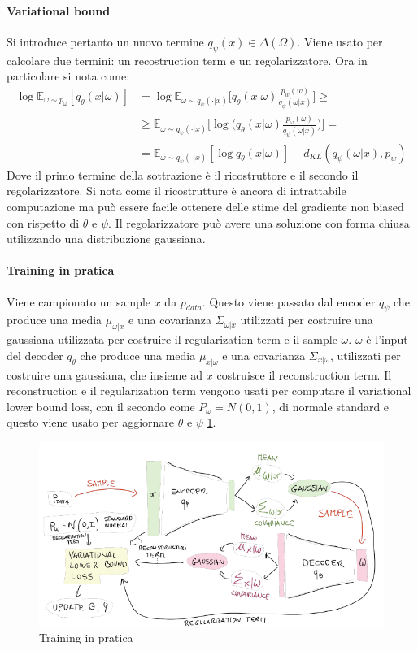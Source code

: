 \paragraph{Variational bound}
Si introduce pertanto un nuovo termine $q_\psi(x)\in\Delta(\Omega)$.
Viene usato per calcolare due termini: un recostruction term e un regolarizzatore.
Ora in particolare si nota come:
\begin{align*}
	\log\mathbb{E}_{\omega\sim p_\omega} [q_\theta(x|\omega)] &= \log\mathbb{E}_{\omega\sim q_\psi(\cdot|x)}\bigl[q_\theta(x|\omega)\frac{p_w(w)}{q_\psi(\omega|x)}\bigr]\ge\\
	&\ge \mathbb{E}_{\omega\sim q_\psi(\cdot|x)}\bigl[\log\bigl(q_\theta(x|\omega)\frac{p_\omega(\omega)}{q_\psi(\omega|x)}\bigr)\bigr]=\\
	&=\mathbb{E}_{\omega\sim q_\psi(\cdot|x)}[\log q_\theta(x|\omega)] - d_{KL}(q_\psi(\omega|x), p_w)
\end{align*}
Dove il primo termine della sottrazione \`e il ricostruttore e il secondo il regolarizzatore.
Si nota come il ricostrutture \`e ancora di intrattabile computazione ma pu\`o essere facile ottenere delle stime del gradiente non biased con rispetto di $\theta$ e $\psi$.
Il regolarizzatore pu\`o avere una soluzione con forma chiusa utilizzando una distribuzione gaussiana.

\paragraph{Training in pratica}
Viene campionato un sample $x$ da $p_{data}$.
Questo viene passato dal encoder $q_\psi$ che produce una media $\mu_{\omega|x}$ e una covarianza $\Sigma_{\omega|x}$ utilizzati per costruire una gaussiana utilizzata per costruire il regularization term e il sample $\omega$.
$\omega$ \`e l'input del decoder $q_\theta$ che produce una media $\mu_{x|\omega}$ e una covarianza $\Sigma_{x|\omega}$, utilizzati per costruire una gaussiana, che insieme ad $x$ costruisce il reconstruction term.
Il reconstruction e il regularization term vengono usati per computare il variational lower bound loss, con il secondo come $P_\omega = N(0,1)$, di normale standard e questo viene usato per aggiornare $\theta$ e $\psi$ \ref{fig:chapter12-14}.

\begin{figure}
	\centering
	\includegraphics[width=0.8\linewidth]{imgs/chapter12/img14}
	\caption{Training in pratica}
	\label{fig:chapter12-14}
\end{figure}
